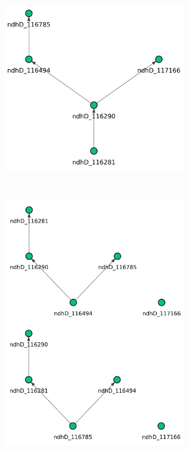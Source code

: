 \documentclass[
]{article}
\theoremstyle{definition}
\theoremstyle{remark}
\begin{document}
\begin{figure}[H]

\begin{minipage}{0.43\linewidth}

\includegraphics[width=3.125in,height=\textheight,keepaspectratio]{Figures Causal Chronology/chron_DAG_HC_ndhD.png}

\end{minipage}%
%
\begin{minipage}{0.13\linewidth}
~\end{minipage}%
%
\begin{minipage}{0.43\linewidth}

\includegraphics[width=3.125in,height=\textheight,keepaspectratio]{Figures Causal Chronology/chron_DAG_PC_ndhD.png}

\end{minipage}%
\newline
\begin{minipage}{0.43\linewidth}

\includegraphics[width=3.125in,height=\textheight,keepaspectratio]{Figures Causal Chronology/chron_DAG_LiNGAM_ndhD.png}


\end{minipage}
\end{figure}
\end{document}

